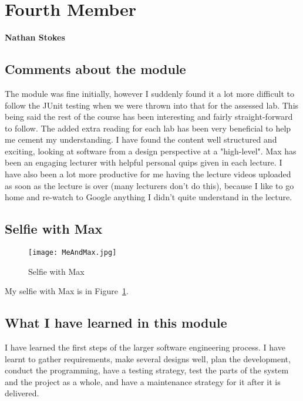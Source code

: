 \section{Fourth Member}
 \textbf{Nathan Stokes}

\subsection{Comments about the module}
	The module was fine initially, however I suddenly found it a lot more difficult to follow the JUnit testing when we were thrown into that for the assessed lab. This being said the rest of the course has been interesting and fairly straight-forward to follow. The added extra reading for each lab has been very beneficial to help me cement my understanding. I have found the content well structured and exciting, looking at software from a design perspective at a "high-level".
	Max has been an engaging lecturer with helpful personal quips given in each lecture. I have also been a lot more productive for me having the lecture videos uploaded as soon as the lecture is over (many lecturers don't do this), because I like to go home and re-watch to Google anything I didn't quite understand in the lecture.

\subsection{Selfie with Max}

\begin{figure}[h]
\caption{Selfie with Max}
\centering
\texttt{[image: MeAndMax.jpg]}
\label{fig:selfie}
\end{figure}

My selfie with Max is in  Figure~\ref{fig:selfie}.

\subsection{What I have learned in this module}
	I have learned the first steps of the larger software engineering process. I have learnt to gather requirements, make several designs well, plan the development, conduct the programming, have a testing strategy, test the parts of the system and the project as a whole, and have a maintenance strategy for it after it is delivered.